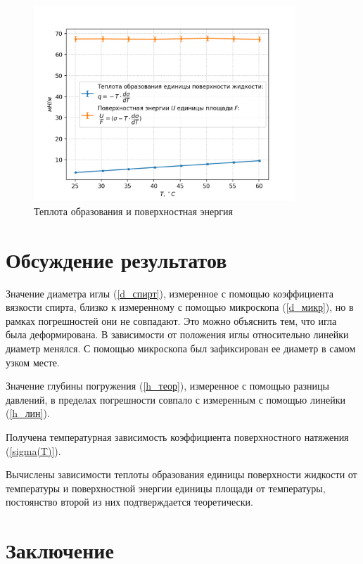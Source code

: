 \documentclass[a4paper,12pt]{article} %
\begin{document}
\begin{figure}[h!]
\begin{center}
\includegraphics[width=0.875\textwidth]{9.png}
\end{center}
\caption{Теплота образования и поверхностная энергия}
\end{figure}

\section{Обсуждение результатов}

Значение диаметра иглы (\ref{d_спирт}), измеренное с помощью коэффициента вязкости спирта, близко к измеренному с помощью микроскопа (\ref{d_микр}), но в рамках погрешностей они не совпадают. Это можно объяснить тем, что игла была деформирована. В зависимости от положения иглы относительно линейки диаметр менялся. С помощью микроскопа был зафиксирован ее диаметр в самом узком месте.

Значение глубины погружения (\ref{h_теор}), измеренное с помощью разницы давлений, в пределах погрешности совпало с измеренным с помощью линейки (\ref{h_лин}).

Получена температурная зависимость коэффициента поверхностного натяжения (\ref{sigma(T)}).

Вычислены зависимости теплоты образования единицы поверхности жидкости от температуры и поверхностной энергии единицы площади от температуры, постоянство второй из них подтверждается теоретически.


\section{Заключение}
\end{document}
